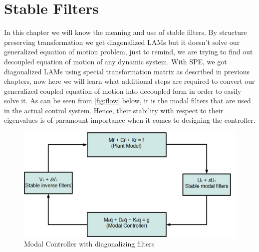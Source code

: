 \chapter{Stable Filters}

In this chapter we will know the meaning and use of stable filters. By 
structure preserving transformation we get diagonalized LAMs but it 
doesn't solve our generalized equation of motion problem, just to remind, 
we are trying to find out decoupled equation of motion of any dynamic 
system. With SPE, we got diagonalized LAMs using special transformation 
matrix as described in previous chapters, now here we will learn what 
additional steps are required to convert our generalized coupled equation 
of motion into decoupled form in order to easily solve it. As can be seen 
from \autoref{fig:flow} below, it is the modal filters that are used 
in the actual control system. Hence, their stability with respect to 
their eigenvalues is of paramount importance when it comes to designing 
the controller.
\begin{figure}[hb]
\includegraphics[scale=0.6]{flow}
\caption{Modal Controller with diagonalizing filters}
\label{fig:flow}
\end{figure}

